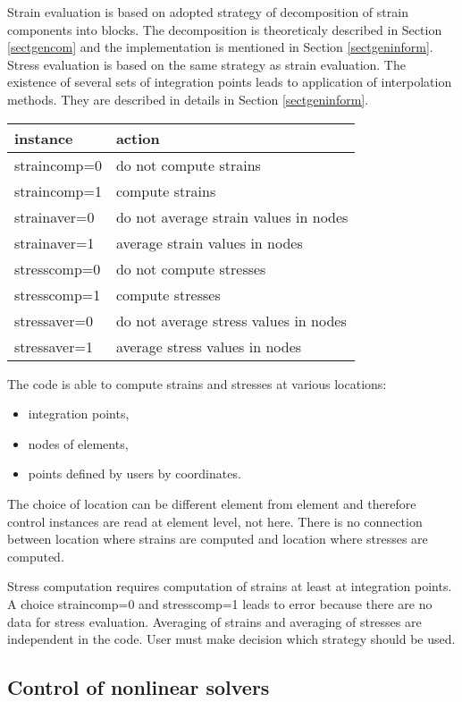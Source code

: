 Strain evaluation is based on adopted strategy of decomposition of strain components
into blocks. The decomposition is theoreticaly described in Section \ref{sectgencom} and the
implementation is mentioned in Section \ref{sectgeninform}. Stress evaluation is based on
the same strategy as strain evaluation. The existence of several sets of integration points
leads to application of interpolation methods. They are described in details in Section \ref{sectgeninform}.

\begin{tabular}{|l|l|}
\hline
instance & action
\\ \hline \hline
straincomp=0 & do not compute strains
\\ \hline
straincomp=1 & compute strains
\\ \hline \hline
strainaver=0 & do not average strain values in nodes
\\ \hline
strainaver=1 & average strain values in nodes
\\ \hline \hline
stresscomp=0 & do not compute stresses
\\ \hline
stresscomp=1 & compute stresses
\\ \hline \hline
stressaver=0 & do not average stress values in nodes
\\ \hline
stressaver=1 & average stress values in nodes
\\ \hline
\end{tabular}

The code is able to compute strains and stresses at various locations:
\begin{itemize}
\item{integration points,}
\item{nodes of elements,}
\item{points defined by users by coordinates.}
\end{itemize}
The choice of location can be different element from element and therefore control instances are read
at element level, not here. There is no connection between location where strains are computed and
location where stresses are computed.

Stress computation requires computation of strains at least at integration points.
A choice straincomp=0 and stresscomp=1 leads
to error because there are no data for stress evaluation. Averaging of strains and averaging of stresses
are independent in the code. User must make decision which strategy should be used.


\subsection{Control of nonlinear solvers}

